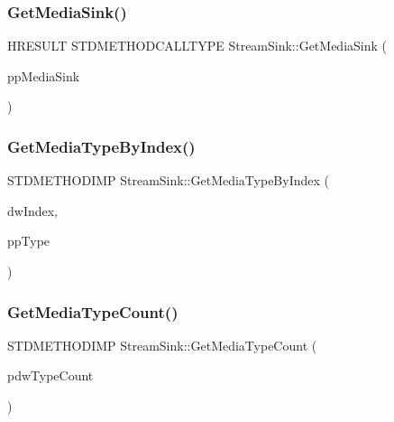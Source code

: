 \mbox{\label{class_stream_sink_ab896b47cbd002f38ea010400efa580a6}} 
\subsubsection{\texorpdfstring{Get\+Media\+Sink()}{GetMediaSink()}}
{\footnotesize\ttfamily H\+R\+E\+S\+U\+LT S\+T\+D\+M\+E\+T\+H\+O\+D\+C\+A\+L\+L\+T\+Y\+PE Stream\+Sink\+::\+Get\+Media\+Sink (\begin{DoxyParamCaption}\item[{\+\_\+\+\_\+\+R\+P\+C\+\_\+\+\_\+deref\+\_\+out\+\_\+opt I\+M\+F\+Media\+Sink $\ast$$\ast$}]{pp\+Media\+Sink }\end{DoxyParamCaption})\hspace{0.3cm}{\ttfamily [inline]}}

\mbox{\label{class_stream_sink_a5ead96334af81648d66123585749ecdd}} 
\subsubsection{\texorpdfstring{Get\+Media\+Type\+By\+Index()}{GetMediaTypeByIndex()}}
{\footnotesize\ttfamily S\+T\+D\+M\+E\+T\+H\+O\+D\+I\+MP Stream\+Sink\+::\+Get\+Media\+Type\+By\+Index (\begin{DoxyParamCaption}\item[{D\+W\+O\+RD}]{dw\+Index,  }\item[{I\+M\+F\+Media\+Type $\ast$$\ast$}]{pp\+Type }\end{DoxyParamCaption})\hspace{0.3cm}{\ttfamily [inline]}}

\mbox{\label{class_stream_sink_a46b2a0c9559652c3f403003d619bdf22}} 
\subsubsection{\texorpdfstring{Get\+Media\+Type\+Count()}{GetMediaTypeCount()}}
{\footnotesize\ttfamily S\+T\+D\+M\+E\+T\+H\+O\+D\+I\+MP Stream\+Sink\+::\+Get\+Media\+Type\+Count (\begin{DoxyParamCaption}\item[{D\+W\+O\+RD $\ast$}]{pdw\+Type\+Count }\end{DoxyParamCaption})\hspace{0.3cm}{\ttfamily [inline]}}

